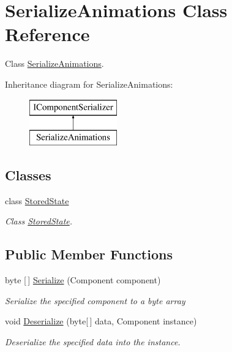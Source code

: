 \hypertarget{class_serialize_animations}{}\section{Serialize\+Animations Class Reference}
\label{class_serialize_animations}


Class \hyperlink{class_serialize_animations}{Serialize\+Animations}.  


Inheritance diagram for Serialize\+Animations\+:\begin{figure}[H]
\begin{center}
\leavevmode
\includegraphics[height=2.000000cm]{class_serialize_animations}
\end{center}
\end{figure}
\subsection*{Classes}
\begin{DoxyCompactItemize}
\item 
class \hyperlink{class_serialize_animations_1_1_stored_state}{Stored\+State}
\begin{DoxyCompactList}\small\item\em Class \hyperlink{class_serialize_animations_1_1_stored_state}{Stored\+State}. \end{DoxyCompactList}\end{DoxyCompactItemize}
\subsection*{Public Member Functions}
\begin{DoxyCompactItemize}
\item 
byte \mbox{[}$\,$\mbox{]} \hyperlink{class_serialize_animations_a05552bb8c8baad409516f661845bc4e7}{Serialize} (Component component)
\begin{DoxyCompactList}\small\item\em Serialize the specified component to a byte array \end{DoxyCompactList}\item 
void \hyperlink{class_serialize_animations_a70a93ea3a6ce6289e19f0552565cebba}{Deserialize} (byte\mbox{[}$\,$\mbox{]} data, Component instance)
\begin{DoxyCompactList}\small\item\em Deserialize the specified data into the instance. \end{DoxyCompactList}\end{DoxyCompactItemize}


